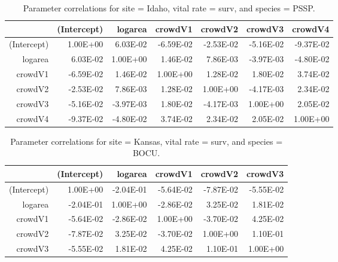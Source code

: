 \documentclass[12pt,]{article}
\begin{document}
\begin{table}[ht]
\centering
\caption{Parameter correlations for site = Idaho, vital rate = surv, and species = PSSP.} 
\begin{tabular}{rrrrrrr}
  \hline
 & (Intercept) & logarea & crowdV1 & crowdV2 & crowdV3 & crowdV4 \\ 
  \hline
(Intercept) & 1.00E+00 & 6.03E-02 & -6.59E-02 & -2.53E-02 & -5.16E-02 & -9.37E-02 \\ 
  logarea & 6.03E-02 & 1.00E+00 & 1.46E-02 & 7.86E-03 & -3.97E-03 & -4.80E-02 \\ 
  crowdV1 & -6.59E-02 & 1.46E-02 & 1.00E+00 & 1.28E-02 & 1.80E-02 & 3.74E-02 \\ 
  crowdV2 & -2.53E-02 & 7.86E-03 & 1.28E-02 & 1.00E+00 & -4.17E-03 & 2.34E-02 \\ 
  crowdV3 & -5.16E-02 & -3.97E-03 & 1.80E-02 & -4.17E-03 & 1.00E+00 & 2.05E-02 \\ 
  crowdV4 & -9.37E-02 & -4.80E-02 & 3.74E-02 & 2.34E-02 & 2.05E-02 & 1.00E+00 \\ 
   \hline
\end{tabular}
\end{table}

\newpage{}

\begin{table}[ht]
\centering
\caption{Parameter correlations for site = Kansas, vital rate = surv, and species = BOCU.} 
\begin{tabular}{rrrrrr}
  \hline
 & (Intercept) & logarea & crowdV1 & crowdV2 & crowdV3 \\ 
  \hline
(Intercept) & 1.00E+00 & -2.04E-01 & -5.64E-02 & -7.87E-02 & -5.55E-02 \\ 
  logarea & -2.04E-01 & 1.00E+00 & -2.86E-02 & 3.25E-02 & 1.81E-02 \\ 
  crowdV1 & -5.64E-02 & -2.86E-02 & 1.00E+00 & -3.70E-02 & 4.25E-02 \\ 
  crowdV2 & -7.87E-02 & 3.25E-02 & -3.70E-02 & 1.00E+00 & 1.10E-01 \\ 
  crowdV3 & -5.55E-02 & 1.81E-02 & 4.25E-02 & 1.10E-01 & 1.00E+00 \\ 
   \hline
\end{tabular}
\end{table}
\end{document}
